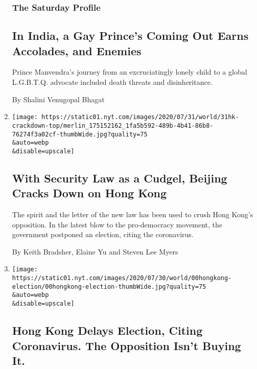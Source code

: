 \begin{enumerate}
  \hypertarget{the-saturday-profile}{%
  \subsubsection{The Saturday Profile}\label{the-saturday-profile}}

  \hypertarget{in-india-a-gay-princes-coming-out-earns-accolades-and-enemies}{%
  \subsection{In India, a Gay Prince's Coming Out Earns Accolades, and
  Enemies}\label{in-india-a-gay-princes-coming-out-earns-accolades-and-enemies}}

  Prince Manvendra's journey from an excruciatingly lonely child to a
  global L.G.B.T.Q. advocate included death threats and disinheritance.

  By Shalini Venugopal Bhagat
\item
  \href{/2020/07/31/world/asia/hong-kong-election-national-security-law.html}{}

  \texttt{[image: https://static01.nyt.com/images/2020/07/31/world/31hk-crackdown-top/merlin\_175152162\_1fa5b592-489b-4b41-86b8-76274f3a02cf-thumbWide.jpg?quality=75\\\&auto=webp\\\&disable=upscale]}

  \hypertarget{with-security-law-as-a-cudgel-beijing-cracks-down-on-hong-kong}{%
  \subsection{With Security Law as a Cudgel, Beijing Cracks Down on Hong
  Kong}\label{with-security-law-as-a-cudgel-beijing-cracks-down-on-hong-kong}}

  The spirit and the letter of the new law has been used to crush Hong
  Kong's opposition. In the latest blow to the pro-democracy movement,
  the government postponed an election, citing the coronavirus.

  By Keith Bradsher, Elaine Yu and Steven Lee Myers
\item
  \href{/2020/07/31/world/asia/hong-kong-election-delayed.html}{}

  \texttt{[image: https://static01.nyt.com/images/2020/07/30/world/00hongkong-election/00hongkong-election-thumbWide.jpg?quality=75\\\&auto=webp\\\&disable=upscale]}

  \hypertarget{hong-kong-delays-election-citing-coronavirus-the-opposition-isnt-buying-it}{%
  \subsection{Hong Kong Delays Election, Citing Coronavirus. The
  Opposition Isn't Buying
  It.}\label{hong-kong-delays-election-citing-coronavirus-the-opposition-isnt-buying-it}}


\end{enumerate}
